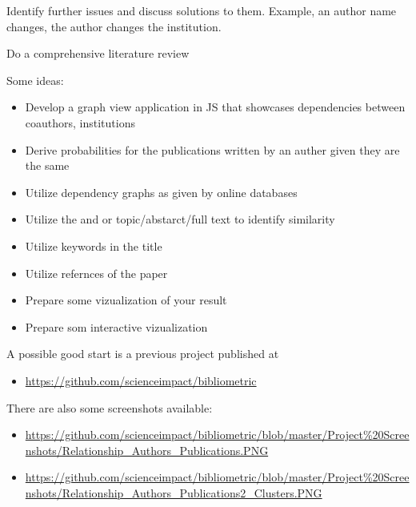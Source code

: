Identify further issues and discuss solutions to them. Example, an
author name changes, the author changes the institution.

Do a comprehensive literature review

Some ideas:

\begin{itemize}
\tightlist
\item
  Develop a graph view application in JS that showcases dependencies
  between coauthors, institutions
\item
  Derive probabilities for the publications written by an auther given
  they are the same
\item
  Utilize dependency graphs as given by online databases
\item
  Utilize the and or topic/abstarct/full text to identify similarity
\item
  Utilize keywords in the title
\item
  Utilize refernces of the paper
\item
  Prepare some vizualization of your result
\item
  Prepare som interactive vizualization
\end{itemize}

A possible good start is a previous project published at

\begin{itemize}
\tightlist
\item
  \url{https://github.com/scienceimpact/bibliometric}
\end{itemize}

There are also some screenshots available:

\begin{itemize}
\tightlist
\item
  \url{https://github.com/scienceimpact/bibliometric/blob/master/Project\%20Screenshots/Relationship_Authors_Publications.PNG}
\item
  \url{https://github.com/scienceimpact/bibliometric/blob/master/Project\%20Screenshots/Relationship_Authors_Publications2_Clusters.PNG}
\end{itemize}
